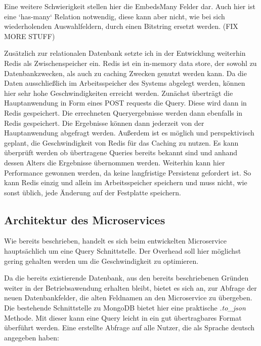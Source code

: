 Eine weitere Schwierigkeit stellen hier die EmbedsMany Felder dar. Auch hier ist eine `has-many` Relation notwendig, diese kann aber nicht, wie bei sich wiederholenden Auswahlfeldern, durch einen Bitstring ersetzt werden. (FIX MORE STUFF)


Zusätzlich zur relationalen Datenbank setzte ich in der Entwicklung weiterhin Redis\cite{redis} als Zwischenspeicher ein. Redis ist ein in-memory data store, der sowohl zu Datenbankzwecken, als auch zu caching Zwecken genutzt werden kann. Da die Daten ausschließlich im Arbeitsspeicher des Systems abgelegt werden, können hier sehr hohe Geschwindigkeiten erreicht werden.
Zunächst überträgt die Hauptanwendung in Form eines POST requests die Query. Diese wird dann in Redis gespeichert. Die errechneten Queryergebnisse werden dann ebenfalls in Redis gespeichert. Die Ergebnisse können dann jederzeit von der Hauptanwendung abgefragt werden. Außerdem ist es möglich und perspektivisch geplant, die Geschwindigkeit von Redis für das Caching zu nutzen. Es kann überprüft werden ob übertragene Queries bereits bekannt sind und anhand dessen Alters die Ergebnisse übernommen werden. Weiterhin kann hier Performance gewonnen werden, da keine langfristige Persistenz gefordert ist. So kann Redis einzig und allein im Arbeitsspeicher speichern und muss nicht, wie sonst üblich, jede Änderung auf der Festplatte speichern.\cite{redis:faq}


\subsection{Architektur des Microservices}
Wie bereits beschrieben, handelt es sich beim entwickelten Microservice hauptsächlich um eine Query Schnittstelle. Der Overhead soll hier möglichst gering gehalten werden um die Geschwindigkeit zu optimieren.

Da die bereits existierende Datenbank, aus den bereits beschriebenen Gründen weiter in der Betriebsawendung erhalten bleibt, bietet es sich an, zur Abfrage der neuen Datenbankfelder, die alten Feldnamen an den Microservice zu übergeben.
Die bestehende Schnittstelle zu MongoDB bietet hier eine praktische \textit{.to\_json} Methode. Mit dieser kann eine Query leicht in ein gut übertragbares Format überführt werden. Eine erstellte Abfrage auf alle Nutzer, die als Sprache deutsch angegeben haben:


